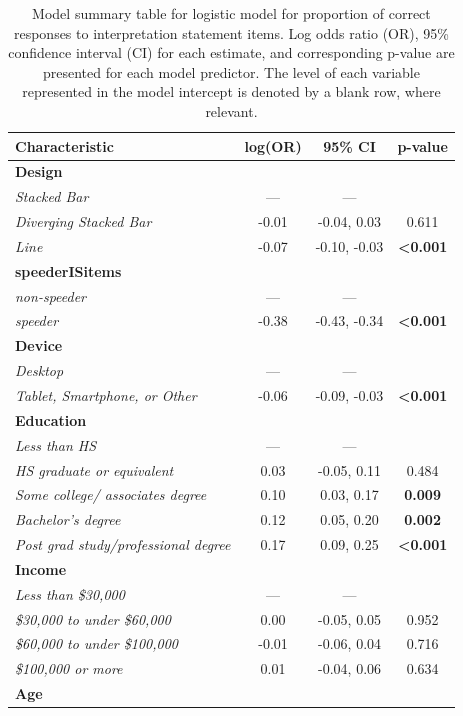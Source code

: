 \documentclass{IEEEcsmag}
\begin{document}
\begin{table}
\caption{Model summary table for logistic model for proportion of correct responses to interpretation statement items. Log odds ratio (OR), 95\% confidence interval (CI) for each estimate, and corresponding p-value are presented for each model predictor. The level of each variable represented in the model intercept is denoted by a blank row, where relevant. }

\begin{tabular}{lccc}
\toprule
\textbf{Characteristic} & \textbf{log(OR)} & \textbf{95\% CI} & \textbf{p-value}\\
\midrule
\textbf{Design} &  &  & \\
\textit{Stacked Bar} & — & — & \\
\textit{Diverging Stacked Bar} & -0.01 & -0.04, 0.03 & 0.611\\
\textit{Line} & -0.07 & -0.10, -0.03 & \textbf{<0.001}\\
\textbf{speederISitems} &  &  & \\\textit{non-speeder} & — & — & \\
\textit{speeder} & -0.38 & -0.43, -0.34 & \textbf{<0.001}\\
\textbf{Device} &  &  & \\
\textit{Desktop} & — & — & \\
\textit{Tablet, Smartphone, or Other} & -0.06 & -0.09, -0.03 & \textbf{<0.001}\\\textbf{Education} &  &  & \\
\textit{Less than HS} & — & — & \\
\textit{HS graduate or equivalent} & 0.03 & -0.05, 0.11 & 0.484\\
\textit{Some college/ associates degree} & 0.10 & 0.03, 0.17 & \textbf{0.009}\\
\textit{Bachelor's degree} & 0.12 & 0.05, 0.20 & \textbf{0.002}\\\textit{Post grad study/professional degree} & 0.17 & 0.09, 0.25 & \textbf{<0.001}\\
\textbf{Income} &  &  & \\
\textit{Less than \$30,000} & — & — & \\
\textit{\$30,000 to under \$60,000} & 0.00 & -0.05, 0.05 & 0.952\\
\textit{\$60,000 to under \$100,000} & -0.01 & -0.06, 0.04 & 0.716\\\textit{\$100,000 or more} & 0.01 & -0.04, 0.06 & 0.634\\
\textbf{Age} &  &  & \\

\end{tabular}
\end{table}
\end{document}
